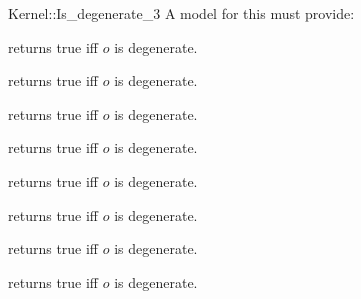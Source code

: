 \begin{ccRefFunctionObjectConcept}{Kernel::Is_degenerate_3}
A model for this must provide:


{returns true iff $o$ is degenerate.}

{returns true iff $o$ is degenerate.}

{returns true iff $o$ is degenerate.}

{returns true iff $o$ is degenerate.}

{returns true iff $o$ is degenerate.}

{returns true iff $o$ is degenerate.}

{returns true iff $o$ is degenerate.}

{returns true iff $o$ is degenerate.}

\end{ccRefFunctionObjectConcept}
